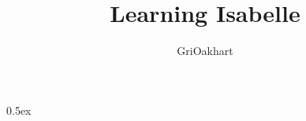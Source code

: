 \documentclass[11pt,a4paper]{article}
\begin{document}
\title{Learning Isabelle}
\author{GriOakhart}
\maketitle

\tableofcontents

\parindent 0pt\parskip 0.5ex



%
%
\end{document}
